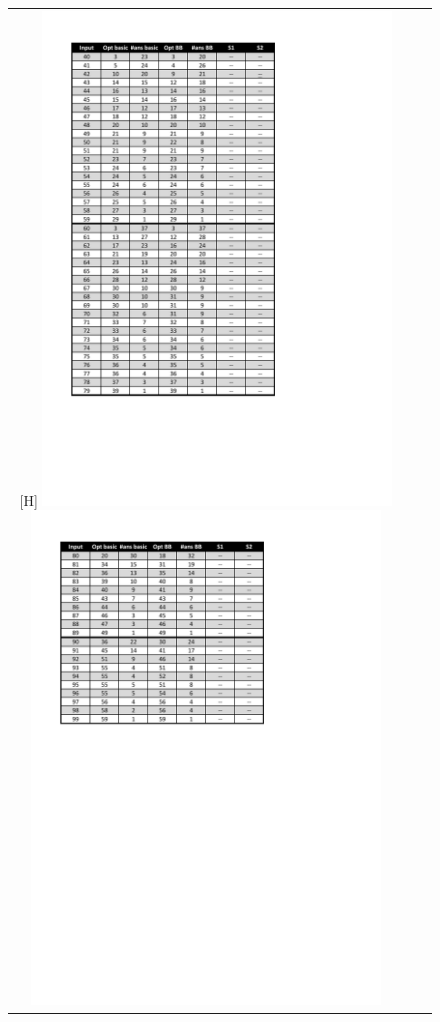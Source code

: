 \documentclass{report}
\begin{document}
\begin{figure}
\centering

\begin{tabular}{ccc}[H]
	\includegraphics[width=350px]{Dati1.pdf}
	\includegraphics[width=350px]{Dati2.pdf}
\end{tabular}
\end{figure}
\end{document}
